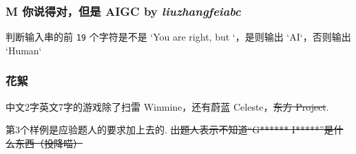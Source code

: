 \frame
{
  \frametitle{M 你说得对，但是 AIGC {by \itshape liuzhangfeiabc}}

	判断输入串的前 \texttt{19} 个字符是不是 `You are right, but `，是则输出 `AI`，否则输出 `Human`

}

\frame
{
	\frametitle{花絮}

	中文2字英文7字的游戏除了扫雷 Winmine，还有蔚蓝 Celeste，\sout{东方 Project}.

	第3个样例是应验题人的要求加上去的. \sout{出题人表示不知道“G****** I*****”是什么东西\tiny{（投降喵）}}

}
